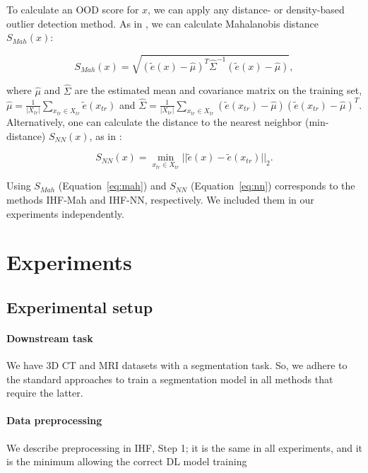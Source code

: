 To calculate an OOD score for $x$, we can apply any distance- or density-based outlier detection method. As in \cite{lee2018simple}, we can calculate Mahalanobis distance $S_{Mah}(x)$: 

\begin{equation}
	\label{eq:mah}
	S_{Mah}(x) = \sqrt{ \left( \tilde{e}(x) - \hat{\mu} \right)^T \hat{\Sigma}^{-1} \left( \tilde{e}(x) - \hat{\mu} \right) },
\end{equation}

\noindent
where $\hat{\mu}$ and $\hat{\Sigma}$ are the estimated mean and covariance matrix on the training set, $\hat{\mu} = \frac{1}{|X_{tr}|} \sum_{x_{tr} \in X_{tr}} \tilde{e} \left(x_{tr}\right)$ and $\hat{\Sigma} = \frac{1}{|X_{tr}|} \sum_{x_{tr} \in X_{tr}} \left( \tilde{e} (x_{tr}) - \hat{\mu} \right) \left( \tilde{e} (x_{tr}) - \hat{\mu} \right)^T$. 
Alternatively, one can calculate the distance to the nearest neighbor (min-distance) $S_{NN}(x)$, as in \cite{karimi2022improving}:

\begin{equation}
	\label{eq:nn}
	S_{NN}(x) = \min_{x_{tr} \in X_{tr}} || \tilde{e} (x) - \tilde{e} (x_{tr}) ||_2.
\end{equation}

Using $S_{Mah}$ (Equation~\ref{eq:mah}) and $S_{NN}$ (Equation~\ref{eq:nn}) corresponds to the methods IHF-Mah and IHF-NN, respectively. We included them in our experiments independently.


\section{Experiments}

\subsection{Experimental setup}

\paragraph{Downstream task} We have 3D CT and MRI datasets with a segmentation task. So, we adhere to the standard approaches to train a segmentation model in all methods that require the latter.

\paragraph{Data preprocessing} We describe preprocessing in IHF, Step 1; it is the same in all experiments, and it is the minimum allowing the correct DL model training

